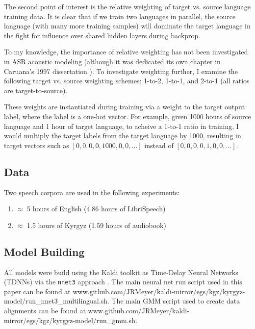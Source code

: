 \documentclass[a4paper]{article}
\begin{document}
The second point of interest is the relative weighting of target vs. source language training data. It is clear that if we train two languages in parallel, the source language (with many more training samples) will dominate the target language in the fight for influence over shared hidden layers during backprop.

To my knowledge, the importance of relative weighting has not been investigated in ASR acoustic modeling (although it was dedicated its own chapter in Caruana's 1997 dissertation \cite{caruana1997}). To investigate weighting further, I examine the following target vs. source weighting schemes: 1-to-2, 1-to-1, and 2-to-1 (all ratios are target-to-source).

These weights are instantiated during training via a weight to the target output label, where the label is a one-hot vector. For example, given 1000 hours of source language and 1 hour of target language, to acheive a 1-to-1 ratio in training, I would multiply the target labels from the target language by 1000, resulting in target vectors such as \texttt{$[0, 0, 0, 0, 1000, 0, 0, \ldots]$} instead of \texttt{$[0, 0, 0, 0, 1, 0, 0, \ldots]$}.



\subsection{Data}

Two speech corpora are used in the following experiments:

\begin{enumerate}
\item $\approx$ 5 hours of English (4.86 hours of LibriSpeech)
\item $\approx$ 1.5 hours of Kyrgyz (1.59 hours of audiobook)
\end{enumerate}

\subsection{Model Building}

All models were build using the Kaldi toolkit as Time-Delay Neural Networks (TDNNs) via the \texttt{nnet3} approach \cite{povey2011,peddinti2015}. The main neural net run script used in this paper can be found at www.github.com/JRMeyer/kaldi-mirror/egs/kgz/kyrgyz-model/run\_nnet3\_multilingual.sh. The main GMM script used to create data alignments can be found at www.github.com/JRMeyer/kaldi-mirror/egs/kgz/kyrgyz-model/run\_gmm.sh.
\end{document}
